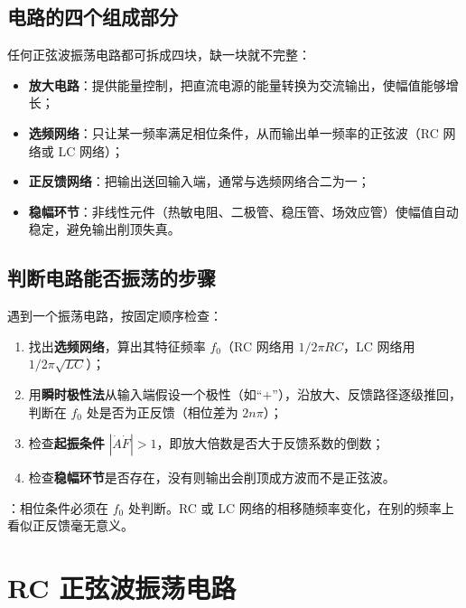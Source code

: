 \subsection{电路的四个组成部分}
任何正弦波振荡电路都可拆成四块，缺一块就不完整：
\begin{itemize}
    \item \textbf{放大电路}：提供能量控制，把直流电源的能量转换为交流输出，使幅值能够增长；
    \item \textbf{选频网络}：只让某一频率满足相位条件，从而输出单一频率的正弦波（RC 网络或 LC 网络）；
    \item \textbf{正反馈网络}：把输出送回输入端，通常与选频网络合二为一；
    \item \textbf{稳幅环节}：非线性元件（热敏电阻、二极管、稳压管、场效应管）使幅值自动稳定，避免输出削顶失真。
\end{itemize}

\subsection{判断电路能否振荡的步骤}
遇到一个振荡电路，按固定顺序检查：
\begin{enumerate}
    \item 找出\textbf{选频网络}，算出其特征频率 $f_0$（RC 网络用 $1/2\pi RC$，LC 网络用 $1/2\pi\sqrt{LC}$）；
    \item 用\textbf{瞬时极性法}从输入端假设一个极性（如“$+$”），沿放大、反馈路径逐级推回，判断在 $f_0$ 处是否为正反馈（相位差为 $2n\pi$）；
    \item 检查\textbf{起振条件} $|\dot A\dot F|>1$，即放大倍数是否大于反馈系数的倒数；
    \item 检查\textbf{稳幅环节}是否存在，没有则输出会削顶成方波而不是正弦波。
\end{enumerate}
：相位条件必须在 $f_0$ 处判断。RC 或 LC 网络的相移随频率变化，在别的频率上看似正反馈毫无意义。

\section{RC 正弦波振荡电路}
